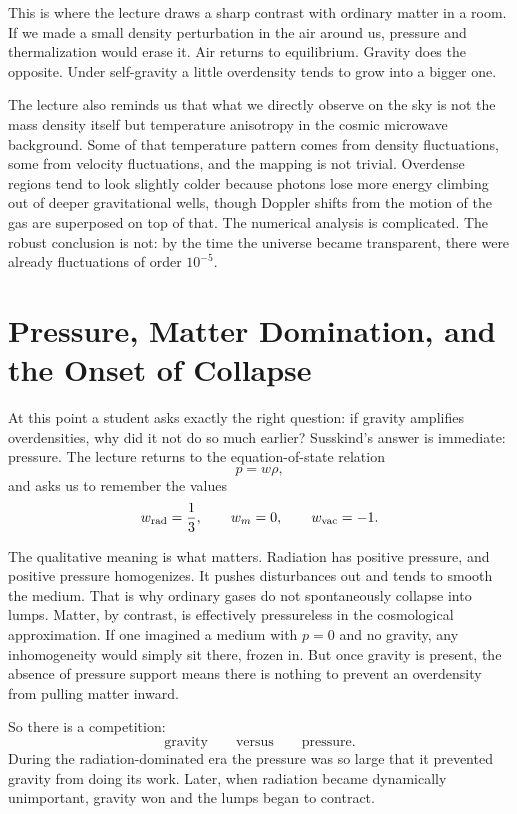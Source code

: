 This is where the lecture draws a sharp contrast with ordinary matter in a room. If we made a small density perturbation in the air around us, pressure and thermalization would erase it. Air returns to equilibrium. Gravity does the opposite. Under self-gravity a little overdensity tends to grow into a bigger one.

The lecture also reminds us that what we directly observe on the sky is not the mass density itself but temperature anisotropy in the cosmic microwave background. Some of that temperature pattern comes from density fluctuations, some from velocity fluctuations, and the mapping is not trivial. Overdense regions tend to look slightly colder because photons lose more energy climbing out of deeper gravitational wells, though Doppler shifts from the motion of the gas are superposed on top of that. The numerical analysis is complicated. The robust conclusion is not: by the time the universe became transparent, there were already fluctuations of order \(10^{-5}\).

\section{Pressure, Matter Domination, and the Onset of Collapse}

At this point a student asks exactly the right question: if gravity amplifies overdensities, why did it not do so much earlier? Susskind's answer is immediate: pressure. The lecture returns to the equation-of-state relation
\begin{equation}
p=w\rho,
\end{equation}
and asks us to remember the values
\begin{equation}
w_{\rm rad}=\frac13,
\qquad
w_m=0,
\qquad
w_{\rm vac}=-1.
\end{equation}

The qualitative meaning is what matters. Radiation has positive pressure, and positive pressure homogenizes. It pushes disturbances out and tends to smooth the medium. That is why ordinary gases do not spontaneously collapse into lumps. Matter, by contrast, is effectively pressureless in the cosmological approximation. If one imagined a medium with \(p=0\) and no gravity, any inhomogeneity would simply sit there, frozen in. But once gravity is present, the absence of pressure support means there is nothing to prevent an overdensity from pulling matter inward.

So there is a competition:
\begin{equation}
\text{gravity} \qquad \text{versus} \qquad \text{pressure}.
\end{equation}
During the radiation-dominated era the pressure was so large that it prevented gravity from doing its work. Later, when radiation became dynamically unimportant, gravity won and the lumps began to contract.

